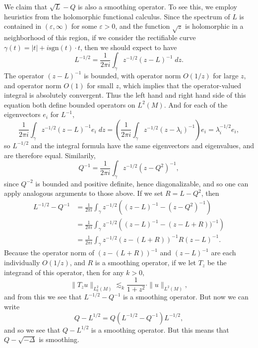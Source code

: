 \begin{example}
    We claim that $\sqrt{L} - Q$ is also a smoothing operator. To see this, we employ heuristics from the holomorphic functional calculus. Since the spectrum of $L$ is contained in $(\varepsilon,\infty)$ for some $\varepsilon > 0$, and the function $\sqrt{z}$ is holomorphic in a neighborhood of this region, if we consider the rectifiable curve $\gamma(t) = |t| + i \text{sgn}(t) \cdot t$, then we should expect to have
    \[ L^{-1/2} = \frac{1}{2 \pi i} \int_\gamma z^{-1/2} (z - L)^{-1}\; dz. \]
    The operator $(z - L)^{-1}$ is bounded, with operator norm $O(1/z)$ for large $z$, and operator norm $O(1)$ for small $z$, which implies that the operator-valued integral is absolutely convergent. Thus the left hand and right hand side of this equation both define bounded operators on $L^2(M)$. And for each of the eigenvectors $e_i$ for $L^{-1}$,
    \[ \frac{1}{2 \pi i} \int_\gamma z^{-1/2} (z - L)^{-1} e_i\; dz = \left( \frac{1}{2 \pi i} \int_\gamma z^{-1/2} (z - \lambda_i)^{-1} \right) e_i = \lambda_i^{-1/2} e_i, \]
    so $L^{-1/2}$ and the integral formula have the same eigenvectors and eigenvalues, and are therefore equal. Similarily,
    \[ Q^{-1} = \frac{1}{2 \pi i} \int_\gamma z^{-1/2} (z - Q^2)^{-1}, \]
    since $Q^{-2}$ is bounded and positive definite, hence diagonalizable, and so one can apply analogous arguments to those above. If we set $R = L - Q^2$, then
    \begin{align*}
        L^{-1/2} - Q^{-1} &= \frac{1}{2 \pi i} \int_\gamma z^{-1/2} \left( (z - L)^{-1} - (z - Q^2)^{-1} \right)\\
        &= \frac{1}{2 \pi i} \int_\gamma z^{-1/2} \left( (z - L)^{-1} - (z - L + R))^{-1} \right)\\
        &= \frac{1}{2 \pi i} \int_\gamma z^{-1/2} (z - (L + R))^{-1} R (z - L)^{-1}.
    \end{align*}
    Because the operator norm of $(z - (L + R))^{-1}$ and $(z - L)^{-1}$ are each individually $O(1/z)$, and $R$ is a smoothing operator, if we let $T_z$ be the integrand of this operator, then for any $k > 0$,
    \[ \| T_z u \|_{L^2_k(M)} \lesssim_k \frac{1}{1 + z^2} \cdot \| u \|_{L^2(M)}, \]
    and from this we see that $L^{-1/2} - Q^{-1}$ is a smoothing operator. But now we can write
    \[ Q - L^{1/2} = Q(L^{-1/2} - Q^{-1}) L^{-1/2}, \]
    and so we see that $Q - L^{1/2}$ is a smoothing operator. But this means that $Q - \sqrt{-\Delta}$ is smoothing.
\end{example}











